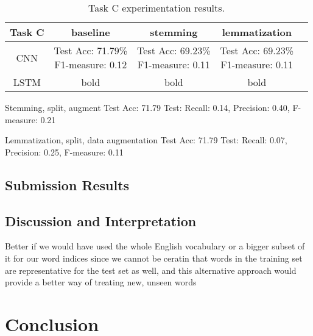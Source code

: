 \documentclass[11pt,a4paper]{article}
\begin{document}
\begin{table*}[t]
\begin{center}
\begin{tabular}{|c|cccc|}
\hline \bf Task C & \bf baseline & \bf stemming & \bf lemmatization & \\ \hline
CNN & \shortstack{Test Acc: 71.79\% \\ F1-measure: 0.12}  & \shortstack{Test Acc: 69.23\% \\ F1-measure: 0.11} & \shortstack{Test Acc: 69.23\% \\ F1-measure: 0.11} & \\ \hline
LSTM & bold & bold & bold & \\
\hline
\end{tabular}
\end{center}
\caption{\label{font-table} Task C experimentation results. }
\end{table*}

Stemming, split, augment
Test Acc: 71.79%
Test: Recall: 0.14, Precision: 0.40, F-measure: 0.21

Lemmatization, split, data augmentation
Test Acc: 71.79%
Test: Recall: 0.07, Precision: 0.25, F-measure: 0.11

\subsection{Submission Results}

\subsection{Discussion and Interpretation}

Better if we would have used the whole English vocabulary or a bigger subset of it for our word indices since we cannot be ceratin that words in the training set are representative for the test set as well, and this alternative approach would provide a better way of treating new, unseen words

\section{Conclusion}
\end{document}
